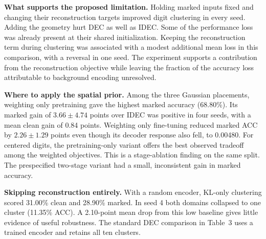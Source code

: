 \textbf{What supports the proposed limitation.} Holding marked inputs fixed and changing their reconstruction targets improved digit clustering in every seed. Adding the geometry hurt DEC as well as IDEC. Some of the performance loss was already present at their shared initialization. Keeping the reconstruction term during clustering was associated with a modest additional mean loss in this comparison, with a reversal in one seed. The experiment supports a contribution from the reconstruction objective while leaving the fraction of the accuracy loss attributable to background encoding unresolved.

\textbf{Where to apply the spatial prior.} Among the three Gaussian placements, weighting only pretraining gave the highest marked accuracy (68.80\%). Its marked gain of $3.66\pm4.74$ points over IDEC was positive in four seeds, with a mean clean gain of 0.84 points. Weighting only fine-tuning reduced marked ACC by $2.26\pm1.29$ points even though its decoder response also fell, to 0.00480. For centered digits, the pretraining-only variant offers the best observed tradeoff among the weighted objectives. This is a stage-ablation finding on the same split. The prespecified two-stage variant had a small, inconsistent gain in marked accuracy.

\textbf{Skipping reconstruction entirely.} With a random encoder, KL-only clustering scored 31.00\% clean and 28.90\% marked. In seed 4 both domains collapsed to one cluster (11.35\% ACC). A 2.10-point mean drop from this low baseline gives little evidence of useful robustness. The standard DEC comparison in Table~3 uses a trained encoder and retains all ten clusters.
